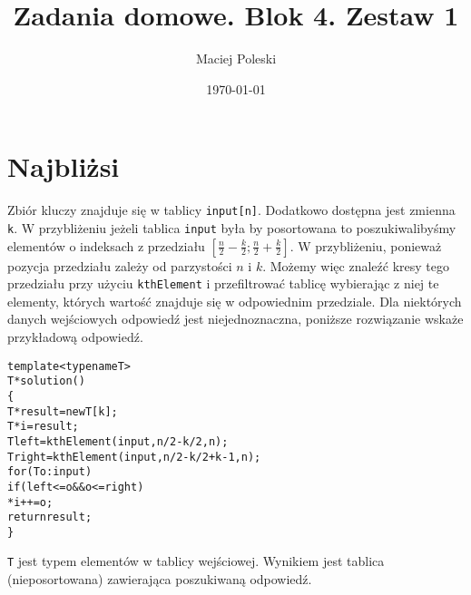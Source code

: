 \documentclass[a4paper,12pt]{article}
\title{Zadania domowe. Blok 4. Zestaw 1}
\author{Maciej Poleski}
\date{\today}
\begin{document}
\maketitle

\newpage

\section{Najbliżsi}
Zbiór kluczy znajduje się w tablicy \verb|input[n]|. Dodatkowo dostępna jest zmienna \verb|k|. W przybliżeniu jeżeli tablica \verb|input| była by posortowana to poszukiwalibyśmy elementów o indeksach z przedziału $[\frac{n}{2}-\frac{k}{2};\frac{n}{2}+\frac{k}{2}]$. W przybliżeniu, ponieważ pozycja przedziału zależy od parzystości $n$ i $k$. Możemy więc znaleźć kresy tego przedziału przy użyciu \verb|kthElement| i przefiltrować tablicę wybierając z niej te elementy, których wartość znajduje się w odpowiednim przedziale. Dla niektórych danych wejściowych odpowiedź jest niejednoznaczna, poniższe rozwiązanie wskaże przykładową odpowiedź.
\begin{alltt}
template<typename T>
T* solution()
\{
    T* result=new T[k];
    T* i=result;
    T left=kthElement(input,n/2-k/2,n);
    T right=kthElement(input,n/2-k/2+k-1,n);
    for(T o : input)
        if(left<=o && o<=right)
            *i++=o;
    return result;
\}
\end{alltt}
\verb|T| jest typem elementów w tablicy wejściowej. Wynikiem jest tablica (nieposortowana) zawierająca poszukiwaną odpowiedź.
\end{document}
